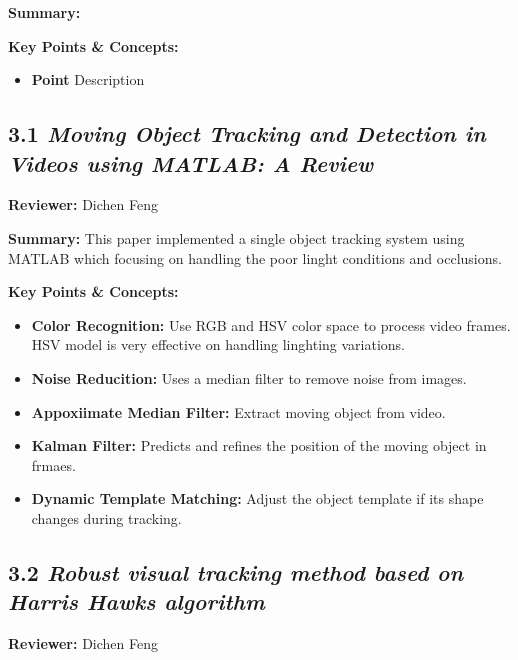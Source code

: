 \documentclass{article}
\begin{document}
\textbf{Summary:}

\vspace{0.3cm}

\textbf{Key Points \& Concepts:}
\begin{itemize}
  \item \textbf{Point} Description
\end{itemize}

\subsection*{3.1 \textit{Moving Object Tracking and Detection in Videos using MATLAB: A Review}}

\hspace*{\parindent}\textbf{Reviewer:} Dichen Feng

\vspace{0.3cm}

\textbf{Summary:} This paper implemented a single object tracking system using MATLAB which focusing on handling the poor linght conditions and occlusions.

\vspace{0.3cm}

\textbf{Key Points \& Concepts:}
\begin{itemize}
  \item \textbf{Color Recognition:} Use RGB and HSV color space to process video frames. HSV model is very effective on handling linghting variations.
  \item \textbf{Noise Reducition:} Uses a median filter to remove noise from images.
  \item \textbf{Appoxiimate Median Filter:} Extract moving object from video.
  \item \textbf{Kalman Filter:} Predicts and refines the position of the moving object in frmaes.
  \item \textbf{Dynamic Template Matching:} Adjust the object template if its shape changes during tracking.
\end{itemize}

\subsection*{3.2 \textit{Robust visual tracking method based on Harris Hawks algorithm}}

\hspace*{\parindent}\textbf{Reviewer:} Dichen Feng
\end{document}
